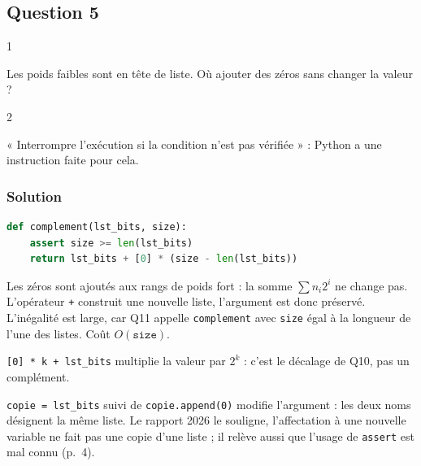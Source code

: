 \documentclass[11pt,a4paper]{article}
\begin{document}
\hypertarget{question-5}{%
\subsection{Question 5}\label{question-5}}

\begin{indication}{1}

Les poids faibles sont en tête de liste. Où ajouter des zéros sans changer la valeur ?

\end{indication}

\begin{indication}{2}

« Interrompre l'exécution si la condition n'est pas vérifiée » : Python a une instruction faite pour cela.

\end{indication}

\hypertarget{solution-4}{%
\subsubsection{Solution}\label{solution-4}}

\begin{lstlisting}[language=Python]
def complement(lst_bits, size):
    assert size >= len(lst_bits)
    return lst_bits + [0] * (size - len(lst_bits))
\end{lstlisting}

Les zéros sont ajoutés aux rangs de poids fort : la somme \(\sum n_i 2^i\) ne change pas. L'opérateur \texttt{+} construit une nouvelle liste, l'argument est donc préservé. L'inégalité est large, car Q11 appelle \texttt{complement} avec \texttt{size} égal à la longueur de l'une des listes. Coût \(O(\texttt{size})\).

\begin{piege}

\texttt{{[}0{]}\allowbreak{}\ *\ k\ +\ lst\_bits} multiplie la valeur par \(2^k\) : c'est le décalage de Q10, pas un complément.

\end{piege}

\begin{piege}

\texttt{copie\ =\ lst\_bits} suivi de \texttt{copie.append(0)} modifie l'argument : les deux noms désignent la même liste. Le rapport 2026 le souligne, l'affectation à une nouvelle variable ne fait pas une copie d'une liste ; il relève aussi que l'usage de \texttt{assert} est mal connu (p.~4).

\end{piege}
\end{document}
